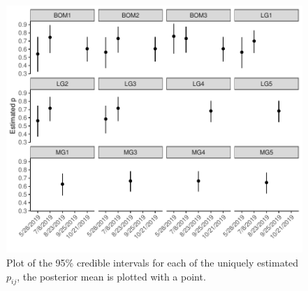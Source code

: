 \documentclass[12pt]{article}\usepackage[]{graphicx}\usepackage[]{color}
\makeatletter
\def\maxwidth{ %
  \ifdim\Gin@nat@width>\linewidth
    \linewidth
  \else
    \Gin@nat@width
  \fi
}
\newenvironment{knitrout}{}{} %
\def\maxwidth{ %
  \ifdim\Gin@nat@width>\linewidth
    \linewidth
  \else
    \Gin@nat@width
  \fi
}
\newenvironment{knitrout}{}{} %
\makeatother
\begin{document}
\begin{figure}
\begin{knitrout}
\color{fgcolor}
\includegraphics[width=\maxwidth]{figure/m5_p-1} 

\end{knitrout}
\caption{Plot of the 95\% credible intervals for each of the uniquely estimated $p_{ij}$, the posterior mean is plotted with a point.}
\label{fig:m5_cred_p}
\end{figure}
\end{document}
